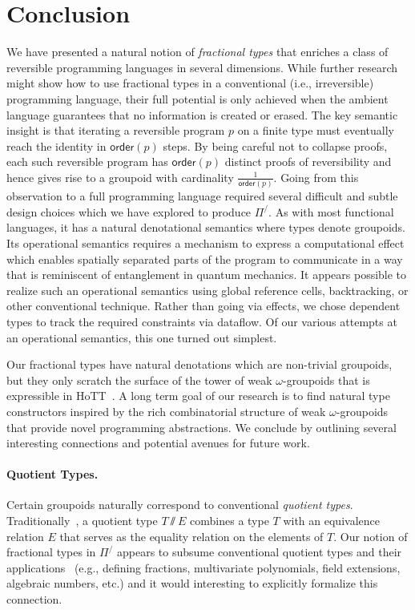 \documentclass[a4paper,USenglish]{lipics-v2016-utf8x}
\newcommand{\pifrac}{\ensuremath{\Pi^/}}
\newcommand{\ag}[2]{#1 \sslash #2}
\newcommand{\ord}[1]{\ensuremath{\mathsf{order}(#1)}}
\begin{document}
\section{Conclusion}

We have presented a natural notion of \emph{fractional types} that enriches a
class of reversible programming languages in several dimensions.  While further
research might show how to use fractional types in a conventional (i.e.,
irreversible) programming language, their full potential is only achieved when
the ambient language guarantees that no information is created or erased. The
key semantic insight is that iterating a reversible program $p$ on a finite type
must eventually reach the identity in $\ord{p}$ steps. By being careful not to
collapse proofs, each such reversible program has $\ord{p}$ distinct proofs of
reversibility and hence gives rise to a groupoid with cardinality
$\frac{1}{\ord{p}}$. Going from this observation to a full programming language
required several difficult and subtle design choices which we have explored to
produce $\Pi^/$. As with most functional languages, it has
a natural denotational semantics where
types denote groupoids. Its operational semantics requires a mechanism to
express a computational effect which enables spatially separated parts of the
program to communicate in a way that is reminiscent of entanglement in quantum
mechanics. It appears possible to realize such an operational semantics using
global reference cells, backtracking, or other conventional technique.  Rather
than going via effects, we chose dependent types to track the required
constraints via dataflow.  Of our various attempts at an operational semantics,
this one turned out simplest.

Our fractional types have natural denotations which are non-trivial groupoids,
but they only scratch the surface of the tower of weak $\omega$-groupoids that
is expressible in HoTT~\cite{hottbook}. A long term goal of our research
is to find natural type constructors inspired by the rich combinatorial
structure of weak $\omega$-groupoids that provide novel programming
abstractions. We conclude by outlining several interesting connections and
potential avenues for future work.

\paragraph*{Quotient Types.} Certain groupoids naturally correspond to
conventional \emph{quotient types}. Traditionally~\cite{quotient}, a quotient
type $\ag{T}{E}$ combines a type $T$ with an equivalence relation $E$ that
serves as the equality relation on the elements of $T$. Our notion of fractional
types in $\pifrac$ appears to subsume conventional quotient types and their
applications~\cite{Cohen2013} (e.g., defining fractions, multivariate
polynomials, field extensions, algebraic numbers, etc.) and it would interesting
to explicitly formalize this connection.
\end{document}
